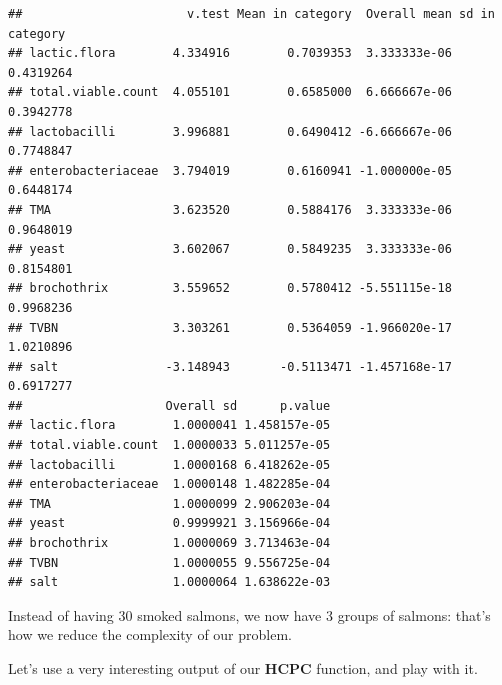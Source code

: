 \documentclass[
]{book}
\newenvironment{Shaded}{\begin{snugshade}}{\end{snugshade}}
\newcommand{\FunctionTok}[1]{\textcolor[rgb]{0.00,0.00,0.00}{#1}}
\newcommand{\NormalTok}[1]{#1}
\newcommand{\SpecialCharTok}[1]{\textcolor[rgb]{0.00,0.00,0.00}{#1}}
\begin{document}
\begin{verbatim}
##                       v.test Mean in category  Overall mean sd in category
## lactic.flora        4.334916        0.7039353  3.333333e-06      0.4319264
## total.viable.count  4.055101        0.6585000  6.666667e-06      0.3942778
## lactobacilli        3.996881        0.6490412 -6.666667e-06      0.7748847
## enterobacteriaceae  3.794019        0.6160941 -1.000000e-05      0.6448174
## TMA                 3.623520        0.5884176  3.333333e-06      0.9648019
## yeast               3.602067        0.5849235  3.333333e-06      0.8154801
## brochothrix         3.559652        0.5780412 -5.551115e-18      0.9968236
## TVBN                3.303261        0.5364059 -1.966020e-17      1.0210896
## salt               -3.148943       -0.5113471 -1.457168e-17      0.6917277
##                    Overall sd      p.value
## lactic.flora        1.0000041 1.458157e-05
## total.viable.count  1.0000033 5.011257e-05
## lactobacilli        1.0000168 6.418262e-05
## enterobacteriaceae  1.0000148 1.482285e-04
## TMA                 1.0000099 2.906203e-04
## yeast               0.9999921 3.156966e-04
## brochothrix         1.0000069 3.713463e-04
## TVBN                1.0000055 9.556725e-04
## salt                1.0000064 1.638622e-03
\end{verbatim}

Instead of having 30 smoked salmons, we now have 3 groups of salmons: that's how we reduce the complexity of our problem.

Let's use a very interesting output of our \textbf{HCPC} function, and play with it.

\begin{Shaded}
\end{Shaded}
\end{document}
